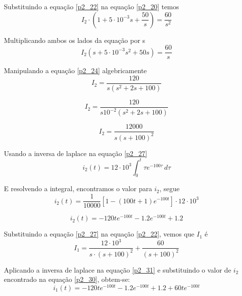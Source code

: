 \documentclass[12pt]{article}%
\begin{document}
    Substituindo a equação \ref{p2_22} na equação \ref{p2_20} temos
    \begin{equation}
      I_2 \cdot (1 + 5 \cdot 10^{-3}s + \frac{50}{s}) = \frac{60}{s^2}
    \label{p2_23}
    \end{equation}
    
    Multiplicando ambos os lados da equação por s
    \begin{equation}
        I_2  (s + 5 \cdot 10^{-3}s^2 + 50s) = \frac{60}{s}
    \label{p2_24}
    \end{equation}
    
    Manipulando a equação \ref{p2_24} algebricamente
    \begin{equation}
      I_2 = \frac{120}{s(s^2+2s+100)}
    \label{p2_25}
    \end{equation}
    
    \begin{equation}
        I_2 = \frac{120}{s10^{-2}(s^2+2s+100)}
    \label{p2_26}
    \end{equation}
    
    \begin{equation}
        I_2 = \frac{12000}{s(s+100)^2}
    \label{p2_27}
    \end{equation}
    
    Usando a inversa de laplace na equação \ref{p2_27}
    \begin{equation}
      i_2(t) = 12\cdot10^3 \int_{0}^{t} \tau e^{-100\tau}\,d\tau
    \label{p2_28}
    \end{equation}
    
    E resolvendo a integral, encontramos o valor para $i_2$, segue
    \begin{equation}
      i_2(t) = \frac{1}{10000}[1 - (100t+1)e^{-100t}]\cdot 12 \cdot 10^3
    \label{p2_29}
    \end{equation}
    
    \begin{equation}
      i_2(t) = -120te^{-100t}-1.2e^{-100t}+1.2
    \label{p2_30}
    \end{equation}
    
    Substituindo a equação \ref{p2_27} na equação \ref{p2_22}, vemos que $I_1$ é 
    \begin{equation}
      I_1 = \frac{12 \cdot 10^3}{s \cdot(s+100)^2} + \frac{60}{(s+100)^2}
    \label{p2_31}
    \end{equation}
    
    Aplicando a inversa de laplace na equação \ref{p2_31} e substituindo o valor de $i_2$ encontrado na equação \ref{p2_30}, obtem-se:
    \begin{equation}
      i_1(t) = -120te^{-100t} - 1.2e^{-100t} + 1.2 + 60te^{-100t}
    \label{p2_32}
    \end{equation}
    
\end{document}
